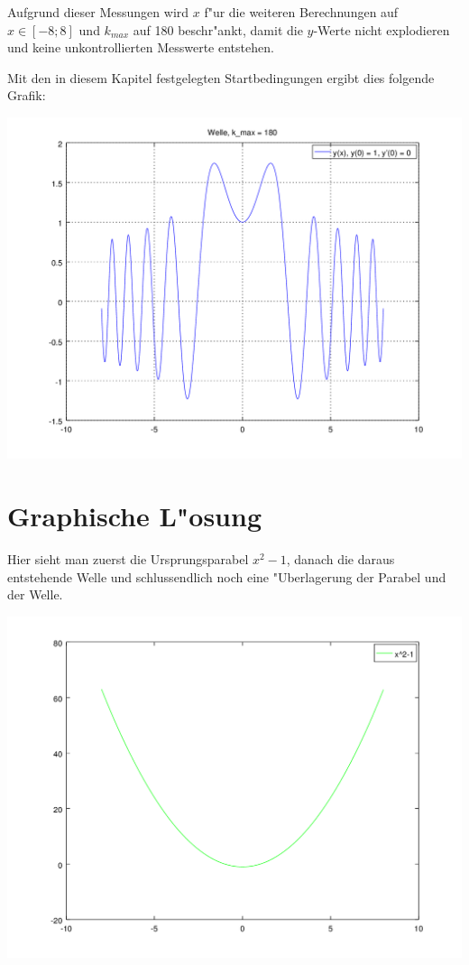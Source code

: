\begin{refsection}
Aufgrund dieser Messungen wird $x$ f"ur die weiteren Berechnungen auf $x \in 
[-8;8]$ und $k_{max}$ auf 180 beschr"ankt, damit die $y$-Werte nicht 
explodieren und keine unkontrollierten Messwerte entstehen.

Mit den in diesem Kapitel festgelegten Startbedingungen ergibt dies folgende 
Grafik:

\includegraphics[scale=0.7]{./wellen/octave/images/kmax/ak180-88wave.png}


\section{Graphische L"osung}

Hier sieht man zuerst die Ursprungsparabel $x^2-1$, danach die daraus 
entstehende Welle und schlussendlich noch eine "Uberlagerung der Parabel und 
der Welle.

\includegraphics[scale=0.6]{./wellen/octave/images/a01a10/parabola.png}


\end{refsection}
